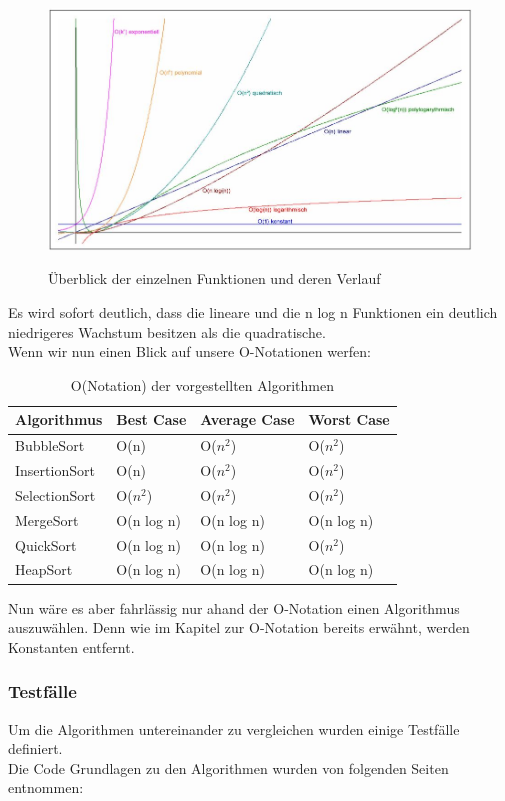 \documentclass{article}
\begin{document}
\begin{figure} [h]
\centering
\includegraphics [width=\linewidth]{OWachstum.JPG} \label{fig:WachstumONotation}
\caption{Überblick der einzelnen Funktionen und deren Verlauf \cite{Rehn2006Sortieralgorithmen}}
\end{figure}
Es wird sofort deutlich, dass die lineare und die n log n Funktionen ein deutlich niedrigeres Wachstum besitzen als die quadratische.\\Wenn wir nun einen Blick auf unsere O-Notationen werfen: \\

\begin{table}[h]
\centering
\begin{tabular}{llll}
	\hline
	\textbf{Algorithmus} & \textbf{Best Case} & \textbf{Average Case} & \textbf{Worst Case} \\
	\hline
	BubbleSort & O(n) & O($n^{2}$) & O($n^{2}$) \\
InsertionSort & O(n) & O($n^{2}$) & O($n^{2}$) \\
SelectionSort & O($n^{2}$) & O($n^{2}$) & O($n^{2}$) \\
MergeSort & O(n log n) & O(n log n) & O(n log n) \\
QuickSort & O(n log n) & O(n log n) & O($n^{2}$) \\
HeapSort & O(n log n) & O(n log n) & O(n log n) \\
	\hline
\end{tabular}
\caption{O(Notation) der vorgestellten Algorithmen \cite{India2015Dataset}}
\label{tab:HeapSort}
\end{table}
Nun wäre es aber fahrlässig nur ahand der O-Notation einen Algorithmus auszuwählen. Denn wie im Kapitel zur O-Notation bereits erwähnt, werden Konstanten entfernt.  

\subsubsection{Testfälle}
Um die Algorithmen untereinander zu vergleichen wurden einige Testfälle definiert.\\ 
Die Code Grundlagen zu den Algorithmen wurden von folgenden Seiten entnommen: \cite{bubbleSortCode,selectionSortCode,insertionSortCode,mergeSortCode,quickSortCode,heapSortCode}\\\\
\end{document}
